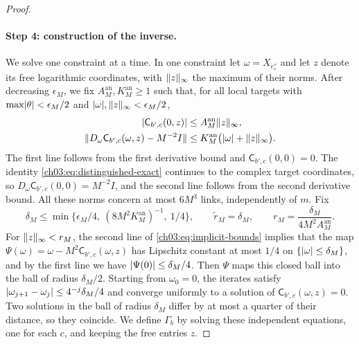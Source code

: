 \begin{proof}
\paragraph{Step 4: construction of the inverse.}
We solve one constraint at a time. In one constraint let $\omega=X_{e^*_c}$ and let $z$ denote its free logarithmic coordinates, with $\lVert z\rVert_\infty$ the maximum of their norms. After decreasing $\epsilon_M$, we fix $A_M^{\mathrm{an}},K_M^{\mathrm{an}}\ge1$ such that, for all local targets with $\max\lvert \theta\rvert<\epsilon_M/2$ and $\lvert \omega\rvert,\lVert z\rVert_\infty<\epsilon_M/2$,
\begin{equation}\label{ch03:eq:implicit-bounds}
 \begin{split}
 \lvert \mathsf C_{b',c}(0,z)\rvert&\le A_M^{\mathrm{an}}\lVert z\rVert_\infty,\\
 \lVert D_\omega \mathsf C_{b',c}(\omega,z)-M^{-2}I\rVert&\le K_M^{\mathrm{an}}\bigl(\lvert \omega\rvert +\lVert z\rVert_\infty\bigr).
 \end{split}
\end{equation}
The first line follows from the first derivative bound and $\mathsf C_{b',c}(0,0)=0$. The identity \eqref{ch03:eq:distinguished-exact} continues to the complex target coordinates, so $D_\omega \mathsf C_{b',c}(0,0)=M^{-2}I$, and the second line follows from the second derivative bound. All these norms concern at most $6M^3$ links, independently of $m$. Fix
\[
 \delta_M\le\min\bigl\{\epsilon_M/4,\ (8M^2K_M^{\mathrm{an}})^{-1},\ 1/4\bigr\},\qquad
 \widetilde r_M=\delta_M,\qquad
 r_M=\frac{\delta_M}{4M^2A_M^{\mathrm{an}}}.
\]
For $\lVert z\rVert_\infty<r_M$, the second line of \eqref{ch03:eq:implicit-bounds} implies that the map $\Psi(\omega)=\omega -M^2\mathsf C_{b',c}(\omega,z)$ has Lipschitz constant at most $1/4$ on $\{\lvert \omega\rvert \le\delta_M\}$, and by the first line we have $\lvert \Psi(0)\rvert\le\delta_M/4$. Then $\Psi$ maps this closed ball into the ball of radius $\delta_M/2$. Starting from $\omega_0=0$, the iterates satisfy $\lvert \omega_{j+1}-\omega_j\rvert\le4^{-j}\delta_M/4$ and converge uniformly to a solution of $\mathsf C_{b',c}(\omega,z)=0$. Two solutions in the ball of radius $\delta_M$ differ by at most a quarter of their distance, so they coincide. We define $\Gamma_b$ by solving these independent equations, one for each $c$, and keeping the free entries $z$.


\end{proof}
